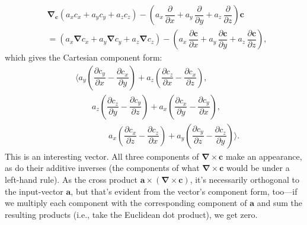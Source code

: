 \documentclass[12pt]{article}
\renewcommand{\vv}[1]{\mathbf{#1}}
\newcommand{\del}{\boldsymbol{\nabla}}
\begin{document}
\begin{equation*}
\begin{split}
&\del_{\vv c} \left( a_x c_x + a_y c_y + a_z c_z \right) - \left( a_x \, \dfrac{\partial}{\partial x} + a_y \, \dfrac{\partial}{\partial y} + a_z \, \dfrac{\partial}{\partial z} \right) \vv c \\[3pt]
&= \left( a_x \del c_x + a_y \del c_y + a_z \del c_z \right) - \left( a_x \, \dfrac{\partial \vv c}{\partial x} + a_y \, \dfrac{\partial \vv c}{\partial y} + a_z \, \dfrac{\partial \vv c}{\partial z} \right) ,
\end{split}
\end{equation*}
which gives the Cartesian component form:
\begin{equation*}
\begin{split}
& \Bigg \langle a_y \left( \dfrac{\partial c_y}{\partial x} - \dfrac{\partial c_x}{\partial y} \right) + a_z \left( \dfrac{\partial c_z}{\partial x} - \dfrac{\partial c_x}{\partial z} \right) , \\
&\qquad  a_z \left( \dfrac{\partial c_z}{\partial y} - \dfrac{\partial c_y}{\partial z} \right) + a_x \left( \dfrac{\partial c_x}{\partial y} - \dfrac{\partial c_y}{\partial x} \right) , \\
&\qquad \qquad  a_x \left( \dfrac{\partial c_x}{\partial z} - \dfrac{\partial c_z}{\partial x} \right) + a_y \left( \dfrac{\partial c_y}{\partial z} - \dfrac{\partial c_z}{\partial y} \right) \Bigg \rangle .
\end{split}
\end{equation*}
This is an interesting vector. All three components of $\del \times \vv c$ make an appearance, as do their additive inverses (the components of what $\del \times \vv c$ would be under a left-hand rule). As the cross product $\vv a \times (\del \times \vv c)$, it's necessarily orthogonal to the input-vector $\vv a$, but that's evident from the vector's component form, too---if we multiply each component with the corresponding component of $\vv a$ and sum the resulting products (i.e., take the Euclidean dot product), we get zero.
\end{document}
